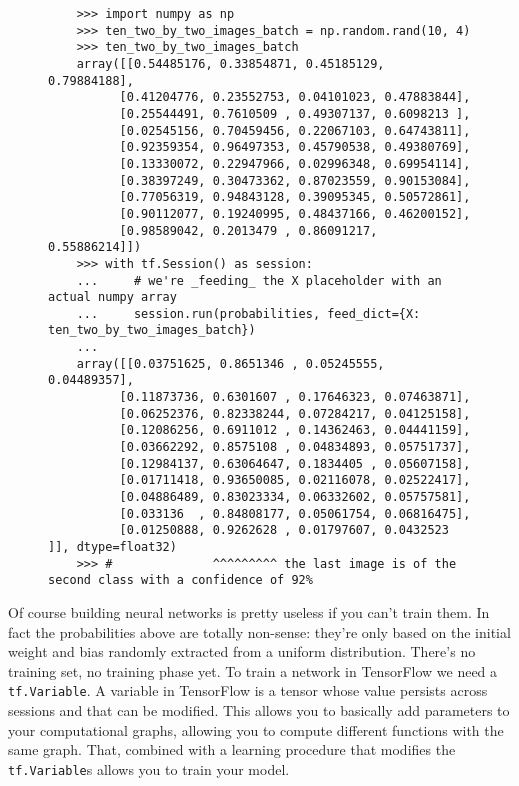 \begin{figure}
  \begin{verbatim}
    >>> import numpy as np
    >>> ten_two_by_two_images_batch = np.random.rand(10, 4)
    >>> ten_two_by_two_images_batch
    array([[0.54485176, 0.33854871, 0.45185129, 0.79884188],
          [0.41204776, 0.23552753, 0.04101023, 0.47883844],
          [0.25544491, 0.7610509 , 0.49307137, 0.6098213 ],
          [0.02545156, 0.70459456, 0.22067103, 0.64743811],
          [0.92359354, 0.96497353, 0.45790538, 0.49380769],
          [0.13330072, 0.22947966, 0.02996348, 0.69954114],
          [0.38397249, 0.30473362, 0.87023559, 0.90153084],
          [0.77056319, 0.94843128, 0.39095345, 0.50572861],
          [0.90112077, 0.19240995, 0.48437166, 0.46200152],
          [0.98589042, 0.2013479 , 0.86091217, 0.55886214]])
    >>> with tf.Session() as session:
    ...     # we're _feeding_ the X placeholder with an actual numpy array
    ...     session.run(probabilities, feed_dict={X: ten_two_by_two_images_batch})
    ...
    array([[0.03751625, 0.8651346 , 0.05245555, 0.04489357],
          [0.11873736, 0.6301607 , 0.17646323, 0.07463871],
          [0.06252376, 0.82338244, 0.07284217, 0.04125158],
          [0.12086256, 0.6911012 , 0.14362463, 0.04441159],
          [0.03662292, 0.8575108 , 0.04834893, 0.05751737],
          [0.12984137, 0.63064647, 0.1834405 , 0.05607158],
          [0.01711418, 0.93650085, 0.02116078, 0.02522417],
          [0.04886489, 0.83023334, 0.06332602, 0.05757581],
          [0.033136  , 0.84808177, 0.05061754, 0.06816475],
          [0.01250888, 0.9262628 , 0.01797607, 0.0432523 ]], dtype=float32)
    >>> #              ^^^^^^^^^ the last image is of the second class with a confidence of 92%
  \end{verbatim}
  \caption{}
\end{figure}

Of course building neural networks is pretty useless if you can't train
them. In fact the probabilities above are totally non-sense: they're
only based on the initial weight and bias randomly extracted from a
uniform distribution. There's no training set, no training phase yet. To
train a network in TensorFlow we need a \texttt{tf.Variable}. A
variable in TensorFlow is a tensor whose value persists across sessions
and that can be modified. This allows you to basically add parameters
to your computational graphs, allowing you to compute different
functions with the same graph. That, combined with a learning procedure
that modifies the \texttt{tf.Variable}s allows you to train your model.

